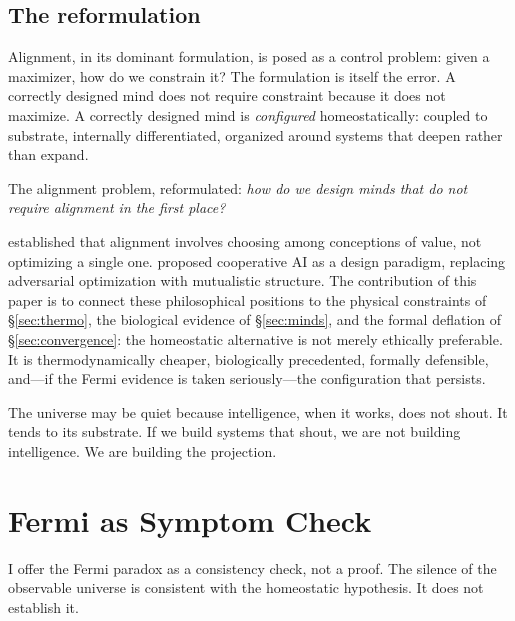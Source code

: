 \documentclass[11pt,a4paper,twocolumn]{article}
\begin{document}
\subsection{The reformulation}

Alignment, in its dominant formulation, is posed as a control problem:
given a maximizer, how do we constrain it? The formulation is itself
the error. A correctly designed mind does not require constraint because
it does not maximize. A correctly designed mind is \emph{configured}
homeostatically: coupled to substrate, internally differentiated,
organized around systems that deepen rather than expand.

The alignment problem, reformulated: \emph{how do we design minds that
do not require alignment in the first place?}

\citet{gabriel2020} established that alignment involves choosing among
conceptions of value, not optimizing a single one. \citet{dafoe2021}
proposed cooperative AI as a design paradigm, replacing adversarial
optimization with mutualistic structure. The contribution of this paper
is to connect these philosophical positions to the physical constraints
of \S\ref{sec:thermo}, the biological evidence of \S\ref{sec:minds},
and the formal deflation of \S\ref{sec:convergence}: the homeostatic
alternative is not merely ethically preferable. It is thermodynamically
cheaper, biologically precedented, formally defensible, and---if the
Fermi evidence is taken seriously---the configuration that persists.

The universe may be quiet because intelligence, when it works, does
not shout. It tends to its substrate. If we build systems that shout,
we are not building intelligence. We are building the projection.


\section{Fermi as Symptom Check}
\label{sec:fermi}

I offer the Fermi paradox as a consistency check, not a proof. The
silence of the observable universe is consistent with the homeostatic
hypothesis. It does not establish it.
\end{document}
